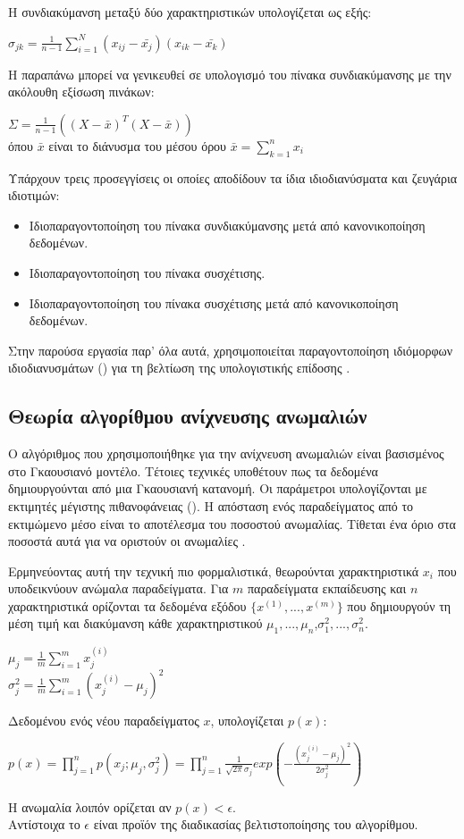 Η συνδιακύμανση μεταξύ δύο χαρακτηριστικών υπολογίζεται ως εξής:
\begin{center}
$\sigma_{jk}=\frac{1}{n-1}\sum_{i=1}^N(x_{ij}-\bar{x_j})(x_{ik}-\bar{x_k})$
\end{center}
Η παραπάνω μπορεί να γενικευθεί σε υπολογισμό του πίνακα συνδιακύμανσης με την ακόλουθη εξίσωση πινάκων:
\begin{center}
$\Sigma=\frac{1}{n-1}((X-\bar{x})^T(X-\bar{x}))$\\
όπου $\bar{x}$ είναι το διάνυσμα του μέσου όρου $\bar{x}=\sum_{k=1}^nx_i$
\end{center}
Υπάρχουν τρεις προσεγγίσεις οι οποίες αποδίδουν τα ίδια ιδιοδιανύσματα και ζευγάρια ιδιοτιμών:
\begin{itemize}
\item Ιδιοπαραγοντοποίηση του πίνακα συνδιακύμανσης μετά από κανονικοποίηση δεδομένων.
\item Ιδιοπαραγοντοποίηση του πίνακα συσχέτισης.
\item Ιδιοπαραγοντοποίηση του πίνακα συσχέτισης μετά από κανονικοποίηση δεδομένων.
\end{itemize}
Στην παρούσα εργασία παρ' όλα αυτά, χρησιμοποιείται παραγοντοποίηση ιδιόμορφων ιδιοδιανυσμάτων () για τη βελτίωση της υπολογιστικής επίδοσης \cite{Plotly}.
\subsection{Θεωρία αλγορίθμου ανίχνευσης ανωμαλιών}
Ο αλγόριθμος που χρησιμοποιήθηκε για την ανίχνευση ανωμαλιών είναι βασισμένος στο Γκαουσιανό μοντέλο. Τέτοιες τεχνικές υποθέτουν πως τα δεδομένα δημιουργούνται από μια Γκαουσιανή κατανομή. Οι παράμετροι υπολογίζονται με εκτιμητές μέγιστης πιθανοφάνειας (). Η απόσταση ενός παραδείγματος από το εκτιμώμενο μέσο είναι το αποτέλεσμα του ποσοστού ανωμαλίας. Τίθεται ένα όριο στα ποσοστά αυτά για να οριστούν οι ανωμαλίες \cite{Anomaly}.\par
Ερμηνεύοντας αυτή την τεχνική πιο φορμαλιστικά, θεωρούνται χαρακτηριστικά $x_i$ που υποδεικνύουν ανώμαλα παραδείγματα. Για $m$ παραδείγματα εκπαίδευσης και $n$ χαρακτηριστικά ορίζονται τα δεδομένα εξόδου $\{x^{(1)}, ...,x^{(m)}\}$ που δημιουργούν τη μέση τιμή και διακύμανση κάθε χαρακτηριστικού $\mu_1, ...,\mu_n$,$\sigma_1^2, ..., \sigma_n^2 $.
\begin{center}
$\mu_j=\frac{1}{m}\sum_{i=1}^m x_j^{(i)}$\\ $\sigma_j^2=\frac{1}{m}\sum_{i=1}^m (x_j^{(i)} -\mu_j)^2$\\
\end{center}
Δεδομένου ενός νέου παραδείγματος $x$, υπολογίζεται $p(x)$:\\
\begin{center}
$p(x)=\prod_{j=1}^n p(x_j;\mu_j, \sigma_j^2)=\prod_{j=1}^n \frac{1}{\sqrt{2\pi}\sigma_j}exp(-\frac{(x_j^{(i)} -\mu_j)^2}{2\sigma_j^2})$
\end{center}
Η ανωμαλία λοιπόν ορίζεται αν $p(x)<\epsilon$.\\
Αντίστοιχα το $\epsilon$ είναι προϊόν της διαδικασίας βελτιστοποίησης του αλγορίθμου.
